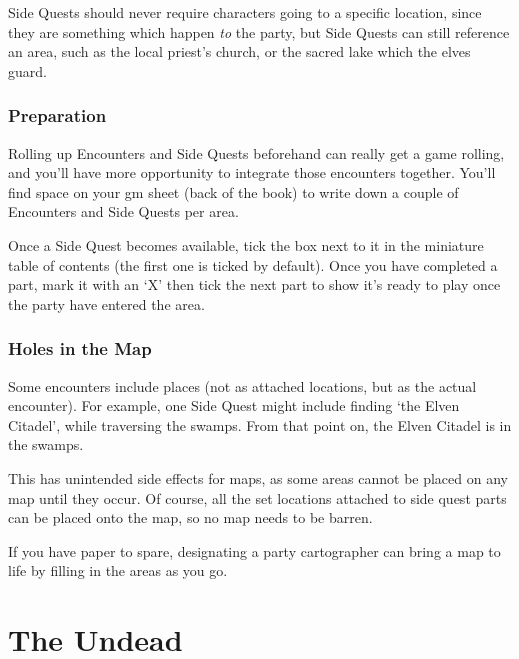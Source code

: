 \begin{multicols}{2}
Side Quests should never require characters going to a specific location, since they are something which happen \emph{to} the party, but Side Quests can still reference an area, such as the local priest's church, or the sacred lake which the elves guard.

\subsubsection{Preparation}

Rolling up Encounters and Side Quests beforehand can really get a game rolling, and you'll have more opportunity to integrate those encounters together.
You'll find space on your \gls{gm} sheet (back of the book) to write down a couple of Encounters and Side Quests per area.

Once a Side Quest becomes available, tick the box next to it in the miniature table of contents (the first one is ticked by default).
Once you have completed a part, mark it with an `X' then tick the next part to show it's ready to play once the party have entered the area.

\subsubsection{Holes in the Map}

Some encounters include places (not as attached locations, but as the actual encounter).
For example, one Side Quest might include finding `the Elven Citadel', while traversing the swamps.
From that point on, the Elven Citadel is in the swamps.

This has unintended side effects for maps, as some areas cannot be placed on any map until they occur.
Of course, all the set locations attached to side quest parts can be placed onto the map, so no map needs to be barren.

If you have paper to spare, designating a party cartographer can bring a map to life by filling in the areas as you go.

\end{multicols}

\section{The Undead}

